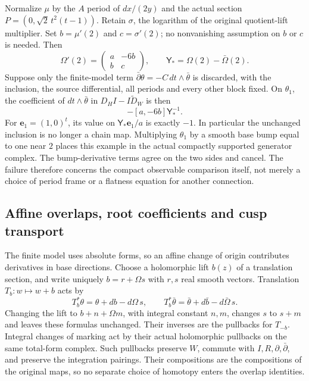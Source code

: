 Normalize $\mu$ by the $A$ period of $dx/(2y)$ and the actual
section $P=(0,\sqrt2\,t^2(t-1))$. Retain $\sigma$, the logarithm
of the original quotient-lift multiplier. Set $b=\mu'(2)$ and $c=\sigma'(2)$;
no nonvanishing assumption on $b$ or $c$ is needed. Then
\[
 \Omega'(2)=\begin{pmatrix}a&-6b\\b&c\end{pmatrix},
 \qquad \mathsf Y_* =\Omega(2)-\bar\Omega(2).
\]
Suppose only the finite-model term
$\bar\partial\theta=-C\,dt\wedge\bar\theta$ is discarded,
with the inclusion, the source differential, all periods and
every other block fixed. On $\theta_1$, the coefficient of
$dt\wedge\bar\theta$ in $D_HI-I\widetilde D_W$ is then
\begin{equation}\label{hp:eq:KS-residual}
 -[a,-6b]\mathsf Y_*^{-1}.
\end{equation}
For $\mathbf e_1=(1,0)^t$, its value on
$\mathsf Y_*\mathbf e_1/a$ is exactly $-1$. In particular the
unchanged inclusion is no longer a chain map. Multiplying
$\theta_1$ by a smooth base bump equal to one near $2$ places
this example in the actual compactly supported generator
complex. The bump-derivative terms agree on the two sides and
cancel. The failure therefore concerns the compact observable
comparison itself, not merely a choice of period frame or a
flatness equation for another connection.

\subsection{Affine overlaps, root coefficients and cusp transport}
\label{hp:subsec:gluing}

The finite model uses absolute forms, so an affine change of
origin contributes derivatives in base directions. Choose a
holomorphic lift $b(z)$ of a translation section, and write uniquely
$b=r+\Omega s$ with $r,s$ real smooth vectors. Translation
$T_b:w\mapsto w+b$ acts by
\begin{equation}\label{hp:eq:affine-pullback}
 T_b^*\theta=\theta+db-d\Omega\,s,
 \qquad
 T_b^*\bar\theta=\bar\theta+d\bar b-d\bar\Omega\,s.
\end{equation}
Changing the lift to $b+n+\Omega m$, with integral constant
$n,m$, changes $s$ to $s+m$ and leaves these formulas unchanged.
Their inverses are the pullbacks for $T_{-b}$. Integral changes
of marking act by their actual holomorphic pullbacks on the
same total-form complex. Such pullbacks preserve $W$, commute
with $I,R,\partial,\bar\partial$, and preserve the integration
pairings. Their compositions are the compositions of the
original maps, so no separate choice of homotopy enters the
overlap identities.

